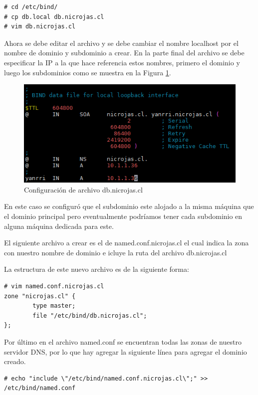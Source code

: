\documentclass[12pt]{article}
\begin{document}
\begin{lstlisting}[frame=single]
# cd /etc/bind/ 
# cp db.local db.nicrojas.cl
# vim db.nicrojas.cl
\end{lstlisting}

Ahora se debe editar el archivo y se debe cambiar el nombre localhost por el nombre de dominio y subdominio a crear. En la parte final del archivo se debe especificar la IP a la que hace referencia estos nombres, primero el dominio y luego los subdominios como se muestra en la Figura \ref{fig9}.

\begin{figure}[!h]
   \centering
   \includegraphics[scale=.65]{imgs/dns_1.PNG}
   \caption{Configuración de archivo db.nicrojas.cl}
   \label{fig9}
\end{figure}

En este caso se configuró que el subdominio este alojado a la misma máquina que el dominio principal pero eventualmente podríamos tener cada subdominio en alguna máquina dedicada para este.

El siguiente archivo a crear es el de named.conf.nicrojas.cl el cual indica la zona con nuestro nombre de dominio e icluye la ruta del archivo db.nicrojas.cl

La estructura de este nuevo archivo es de la siguiente forma:
\begin{lstlisting}[frame=single]
# vim named.conf.nicrojas.cl
zone "nicrojas.cl" {
        type master;
        file "/etc/bind/db.nicrojas.cl";
};
\end{lstlisting}

Por último en el archivo named.conf se encuentran todas las zonas de nuestro servidor DNS, por lo que hay agregar la siguiente línea para agregar el dominio creado.

\begin{lstlisting}[frame=single]
# echo "include \"/etc/bind/named.conf.nicrojas.cl\";" >> /etc/bind/named.conf
\end{lstlisting}
\end{document}
